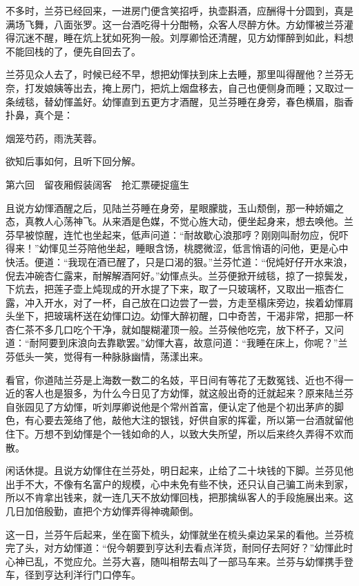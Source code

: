 \documentclass[12pt,UTF8]{ctexbook}
\begin{document}
{{{不多时，兰芬已经回来，一进房门便含笑招呼，执壶斟酒，应酬得十分圆到，真是满场飞舞，八面张罗。这一台酒吃得十分酣畅，众客人尽醉方休。方幼惲被兰芬灌得沉迷不醒，睡在炕上犹如死狗一般。刘厚卿恰还清醒，见方幼惲醉到如此，料想不能回栈的了，便先自回去了。

兰芬见众人去了，时候已经不早，想把幼惲扶到床上去睡，那里叫得醒他？兰芬无奈，打发娘姨等出去，掩上房门，把炕上烟盘移去，自己也便侧身而睡；又取过一条绒毯，替幼惲盖好。幼惲直到五更方才酒醒，见兰芬睡在身旁，春色横眉，脂香扑鼻，真个是：

烟笼芍药，雨洗芙蓉。

欲知后事如何，且听下回分解。





第六回　留夜厢假装阔客　抢汇票硬捉瘟生





且说方幼惲酒醒之后，见陆兰芬睡在身旁，星眼朦胧，玉山颓倒，那一种娇媚之态，真教人心荡神飞。从来酒是色媒，不觉心旌大动，便坐起身来，想去唤他。兰芬早被惊醒，连忙也坐起来，低声问道：“耐故歇心浪那哼？刚刚叫耐勿应，倪吓得来！”幼惲见兰芬陪他坐起，睡眼含饧，桃腮微涩，低言悄语的问他，更是心中快活。便道：“我现在酒已醒了，只是口渴的狠。”兰芬忙道：“倪炖好仔开水来浪，倪去冲碗杏仁露来，耐解解酒阿好。”幼惲点头。兰芬便掀开绒毯，掠了一掠鬓发，下炕去，把莲子壶上炖现成的开水提了下来，取了一只玻璃杯，又取出一瓶杏仁露，冲入开水，对了一杯，自己放在口边尝了一尝，方走至榻床旁边，挨着幼惲肩头坐下，把玻璃杯送在幼惲口边。幼惲大醉初醒，口中奇苦，干渴非常，把那一杯杏仁茶不多几口吃个干净，就如醍糊灌顶一般。兰芬候他吃完，放下杯子，又问道：“耐阿要到床浪向去靠歇罢。”幼惲大喜，故意问道：“我睡在床上，你呢？”兰芬低头一笑，觉得有一种脉脉幽情，荡漾出来。

看官，你道陆兰芬是上海数一数二的名妓，平日间有等花了无数冤钱、近也不得一近的客人也是狠多，为什么今日见了方幼惲，就这般出奇的迁就起来？原来陆兰芬自张园见了方幼惲，听刘厚卿说他是个常州首富，便认定了他是个初出茅庐的脚色，有心要去笼络了他，敲他大注的银钱，好供自家的挥霍，所以第一台酒就留他住下。万想不到幼惲是个一钱如命的人，以致大失所望，所以后来终久弄得不欢而散。

闲话休提。且说方幼惲住在兰芬处，明日起来，止给了二十块钱的下脚。兰芬见他出手不大，不像有名富户的规模，心中未免有些不快，还只认自己骗工尚未到家，所以不肯拿出钱来，就一连几天不放幼惲回栈，把那擒纵客人的手段施展出来。这几日加倍殷勤，直把个方幼惲弄得神魂颠倒。

这一日，兰芬午后起来，坐在窗下梳头，幼惲就坐在梳头桌边呆呆的看他。兰芬梳完了头，对方幼惲道：“倪今朝要到亨达利去看点洋货，耐同仔去阿好？”幼惲此时心神已乱，不觉应允。兰芬大喜，随叫相帮去叫了一部马车来。兰芬与幼惲携手登车，径到亨达利洋行门口停车。

}}}
\end{document}
